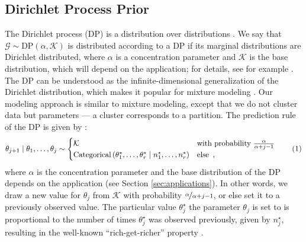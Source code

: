 \documentclass[11pt,a4paper]{article}
\theoremstyle{definition} %
\theoremstyle{case}
\newcommand{\len}{r} %
\newcommand{\numberthis}{\addtocounter{equation}{1}\tag{\theequation}}
\newcommand{\DB}[1]{\todo[inline, color=orange]{ \textbf{DB}: #1 }}
\begin{document}
\subsection{Dirichlet Process Prior}
The Dirichlet process (DP) is a distribution over distributions \parencite{ferguson1973bayesian}. We say that $\mathcal{G} \sim \text{DP}(\alpha, \mathcal{K})$ is distributed according to a DP if its marginal distributions are Dirichlet distributed, where $\alpha$ is a concentration parameter and $\mathcal{K}$ is the base distribution, which will depend on the application; for details, see for example \textcite{teh2010dirichlet}. The DP can be understood as the infinite-dimensional generalization of the Dirichlet distribution, which makes it popular for mixture modeling \parencite[e.g.,][]{rasmussen1999infinite}. Our modeling approach is similar to mixture modeling, except that we do not cluster data but parameters --- a cluster corresponds to a partition. The prediction rule of the DP is given by \parencite[e.g.,][]{ishwaran2001gibbs, blackwell1973ferguson}:
\begin{equation}
    \theta_{j + 1} \mid \theta_1, \ldots, \theta_j\sim \begin{cases}
    \mathcal{K} & \text{with probability } \frac{\alpha}{\alpha + j - 1} \\
    \text{Categorical}\left(\theta_1^{\star}, \ldots, \theta_\len^{\star} \mid n^{\star}_1, \ldots, n^{\star}_\len\right) & \text{else} \enspace ,
    \end{cases} \numberthis
\end{equation}
where $\alpha$ is the concentration parameter and the base distribution of the DP depends on the application (see Section \ref{sec:applications}). In other words, we draw a new value for $\theta_j$ from $\mathcal{K}$ with probability $\nicefrac{\alpha}{\alpha + j - 1}$, or else set it to a previously observed value. The particular value $\theta^{\star}_j$ the parameter $\theta_j$ is set to is proportional to the number of times $\theta^{\star}_j$ was observed previously, given by $n^{\star}_j$, resulting in the well-known ``rich-get-richer'' property \parencite[e.g.,][]{teh2010dirichlet}.
\end{document}

